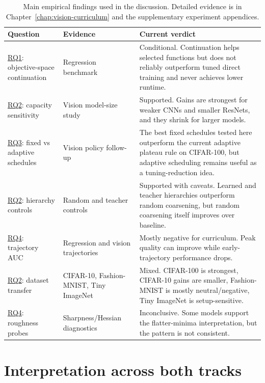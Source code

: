 \documentclass[english,master,a4paper,oneside]{ppfcmthesis}
\begin{document}
\begin{table}[htbp]
\centering
\footnotesize
\begin{tabular}{p{}p{}p{}}
\toprule
Question & Evidence & Current verdict \\
\midrule
\hyperref[rq:continuation]{RQ1}: objective-space continuation & Regression benchmark & Conditional. Continuation helps selected functions but does not reliably outperform tuned direct training and never achieves lower runtime. \\
\hyperref[rq:vision]{RQ2}: capacity sensitivity & Vision model-size study & Supported. Gains are strongest for weaker CNNs and smaller ResNets, and they shrink for larger models. \\
\hyperref[rq:adaptive]{RQ3}: fixed vs adaptive schedules & Vision policy follow-up & The best fixed schedules tested here outperform the current adaptive plateau rule on CIFAR-100, but adaptive scheduling remains useful as a tuning-reduction idea. \\
\hyperref[rq:vision]{RQ2}: hierarchy controls & Random and teacher controls & Supported with caveats. Learned and teacher hierarchies outperform random coarsening, but random coarsening itself improves over baseline. \\
\hyperref[rq:diagnostics]{RQ4}: trajectory AUC & Regression and vision trajectories & Mostly negative for curriculum. Peak quality can improve while early-trajectory performance drops. \\
\hyperref[rq:vision]{RQ2}: dataset transfer & CIFAR-10, Fashion-MNIST, Tiny ImageNet & Mixed. CIFAR-100 is strongest, CIFAR-10 gains are smaller, Fashion-MNIST is mostly neutral/negative, Tiny ImageNet is setup-sensitive. \\
\hyperref[rq:diagnostics]{RQ4}: roughness probes & Sharpness/Hessian diagnostics & Inconclusive. Some models support the flatter-minima interpretation, but the pattern is not consistent. \\
\bottomrule
\end{tabular}
\caption{Main empirical findings used in the discussion. Detailed evidence is in
Chapter~\ref{chap:vision-curriculum} and the supplementary experiment appendices.}
\label{tab:main-findings-overview}
\end{table}

\section{Interpretation across both tracks}
\end{document}
